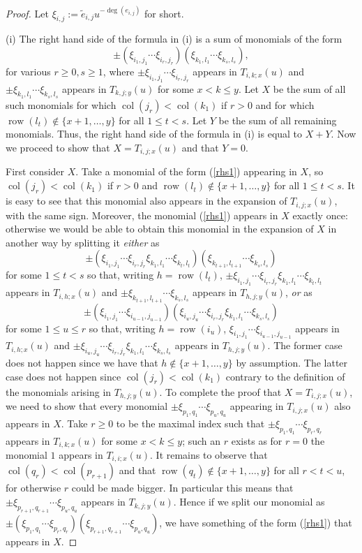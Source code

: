 \documentclass[twoside,12pt,reqno]{amsart}
\def\row{\operatorname{row}}
\def\col{\operatorname{col}}
\begin{document}
\begin{proof}
Let $\xi_{i,j} :=\tilde e_{i,j} u^{-\deg (e_{i,j})}$ for short.

(i)
The right hand side of the formula in (i) is a sum of monomials
of the form
\begin{equation}\label{rhs1}
\pm (\xi_{i_1,j_1}\cdots \xi_{i_r,j_r})(\xi_{k_1,l_1}\cdots \xi_{k_s,l_s}),
\end{equation}
for various $r \geq 0, s \geq 1$, where
$\pm \xi_{i_1,j_1}\cdots \xi_{i_r,j_r}$ appears in
$T_{i,k;x}(u)$ and 
$\pm \xi_{k_1,l_1}\cdots \xi_{k_s,l_s}$ appears in
$T_{k,j;y}(u)$ for some $x < k \leq y$.
Let $X$ be the sum of all such monomials for which
$\col(j_r) < \col(k_1)$ if $r > 0$
and for which $\row(l_t) \notin \{x+1,\dots,y\}$ for all
$1 \leq t < s$.
Let $Y$ be the sum of all remaining monomials.
Thus, the right hand side of the formula in (i)
is equal to $X+Y$. Now we proceed to show that
$X = T_{i,j;x}(u)$ and that $Y = 0$.

First consider $X$.
Take a monomial of the form (\ref{rhs1}) appearing in $X$,
so $\col(j_r) < \col(k_1)$ if $r > 0$ 
and $\row(l_t) \notin \{x+1,\dots,y\}$ for all
$1 \leq t < s$.
It is easy to see that 
this monomial also appears in 
the expansion of $T_{i,j;x}(u)$, with the same sign.
Moreover, the monomial (\ref{rhs1}) appears in $X$ exactly once:
otherwise we would be able to obtain this monomial 
in the expansion of $X$ in another way by splitting it {\em either} as
$$
\pm (\xi_{i_1,j_1}\cdots \xi_{i_r,j_r} \xi_{k_1,l_1}\cdots \xi_{k_t,l_t})
(\xi_{k_{t+1},l_{t+1}}\cdots \xi_{k_s,l_s})
$$
for some $1 \leq t < s$ 
so that, writing $h = \row(l_t)$,
$\pm\xi_{i_1,j_1}\cdots \xi_{i_r,j_r} \xi_{k_1,l_1}\cdots \xi_{k_t,l_t}$
appears in $T_{i,h;x}(u)$ and
$\pm\xi_{k_{t+1},l_{t+1}}\cdots \xi_{k_s,l_s}$
appears in $T_{h,j;y}(u)$,
{\em or} as
$$
\pm (\xi_{i_1,j_1} \cdots \xi_{i_{u-1},j_{u-1}})(\xi_{i_u,j_u}
\cdots \xi_{i_r,j_r} \xi_{k_1,l_1}\cdots\xi_{k_s,l_s})
$$
for some $1 \leq u \leq r$
so that, writing $h = \row(i_u)$,
$\xi_{i_1,j_1} \cdots \xi_{i_{u-1},j_{u-1}}$
appears in $T_{i,h;x}(u)$ and
$\pm\xi_{i_u,j_u}
\cdots \xi_{i_r,j_r} \xi_{k_1,l_1}\cdots\xi_{k_s,l_s}$
appears in
$T_{h,j;y}(u)$.
The former case does not happen since 
we have that $h \notin\{x+1,\dots,y\}$
by assumption.
The latter case does not happen since $\col(j_r) < \col(k_1)$
contrary to the definition of the monomials arising in
$T_{h,j;y}(u)$.
To complete the proof that $X = T_{i,j;x}(u)$, 
we need to show
that every monomial
$\pm \xi_{p_1,q_1}\cdots \xi_{p_u,q_u}$ appearing in
$T_{i,j;x}(u)$ also appears in $X$.
Take $r \geq 0$ to be the maximal index such that
$\pm \xi_{p_1,q_1}\cdots \xi_{p_r,q_r}$ appears in $T_{i,k;x}(u)$
for some $x < k \leq y$; such an $r$ exists as for $r = 0$
the monomial $1$ appears in $T_{i,i;x}(u)$.
It remains to observe that $\col(q_r) < \col(p_{r+1})$
and that
$\row(q_t) \notin \{x+1,\dots,y\}$ for all $r < t < u$, for otherwise
$r$ could be made bigger. In particular this means that
$\pm \xi_{p_{r+1},q_{r+1}} \cdots \xi_{p_u,q_u}$ appears in
$T_{k,j;y}(u)$. Hence if we split our monomial as
$\pm (\xi_{p_1,q_1}\cdots \xi_{p_r,q_r})(\xi_{p_{r+1},q_{r+1}} \cdots \xi_{p_u,q_u})$,
we have something of the form (\ref{rhs1}) that appears in $X$.


\end{proof}
\end{document}
